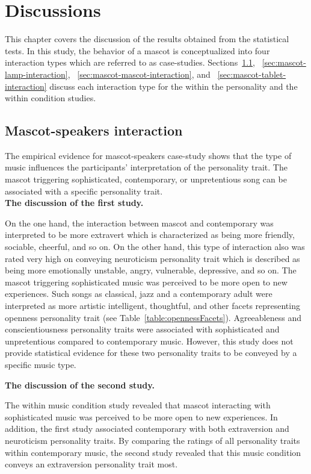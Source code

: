 \chapter{Discussions}
\label{ch:discussions}
This chapter covers the discussion of the results obtained from the statistical tests.
In this study, the behavior of a mascot is conceptualized into four interaction types which are referred to as case-studies.
Sections~\ref{sec:mascot-speakers-interaction}, ~\ref{sec:mascot-lamp-interaction},
~\ref{sec:mascot-mascot-interaction}, and ~\ref{sec:mascot-tablet-interaction} discuss each interaction type for the
within the personality and the within condition studies.

\section{Mascot-speakers interaction}
\label{sec:mascot-speakers-interaction}
The empirical evidence for mascot-speakers case-study shows that the type of music influences the participants'
interpretation of the personality trait.
The mascot triggering sophisticated, contemporary, or unpretentious song can be associated
with a specific personality trait. \\

\textbf{The discussion of the first study.}\par
On the one hand, the interaction between mascot and contemporary was interpreted
to be more extravert which is characterized as being more friendly,
sociable, cheerful, and so on.
On the other hand, this type of interaction also was rated very high on conveying
neuroticism personality trait which is described as being more emotionally unstable,
angry, vulnerable, depressive, and so on.
The mascot triggering sophisticated music was perceived to be more open to new experiences.
Such songs as classical, jazz and a contemporary adult were interpreted as more artistic intelligent,
thoughtful, and other facets representing openness personality trait (see Table~\ref{table:opennessFacets}).
Agreeableness and conscientiousness personality traits were associated with sophisticated and
unpretentious compared to contemporary music.
However, this study does not provide statistical evidence for these two personality traits to be
conveyed by a specific music type.

\textbf{The discussion of the second study.}\par
The within music condition study revealed that mascot interacting with sophisticated music
was perceived to be more open to new experiences.
In addition, the first study associated contemporary with both extraversion and neuroticism personality traits.
By comparing the ratings of all personality traits within contemporary music, the second study revealed that this
music condition conveys an extraversion personality trait most.


